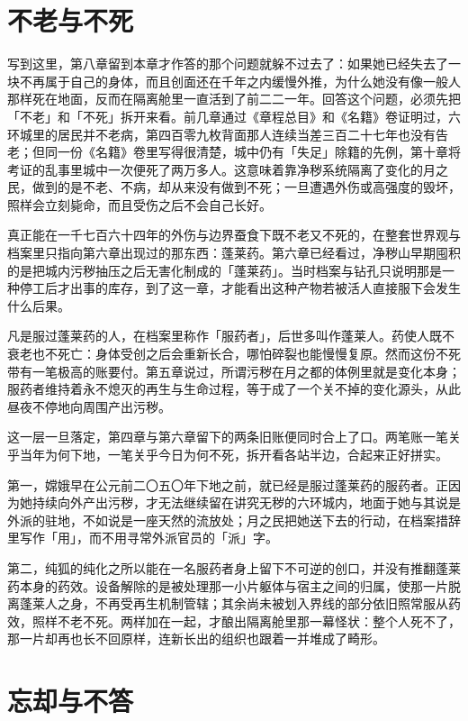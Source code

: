 \section{不老与不死}

写到这里，第八章留到本章才作答的那个问题就躲不过去了：如果她已经失去了一块不再属于自己的身体，而且创面还在千年之内缓慢外推，为什么她没有像一般人那样死在地面，反而在隔离舱里一直活到了前二二一年。回答这个问题，必须先把「不老」和「不死」拆开来看。前几章通过《章程总目》和《名籍》卷证明过，六环城里的居民并不老病，第四百零九枚背面那人连续当差三百二十七年也没有告老；但同一份《名籍》卷里写得很清楚，城中仍有「失足」除籍的先例，第十章将考证的乱事里城中一次便死了两万多人。这意味着靠净秽系统隔离了变化的月之民，做到的是不老、不病，却从来没有做到不死；一旦遭遇外伤或高强度的毁坏，照样会立刻毙命，而且受伤之后不会自己长好。

真正能在一千七百六十四年的外伤与边界蚕食下既不老又不死的，在整套世界观与档案里只指向第六章出现过的那东西：蓬莱药。第六章已经看过，净秽山早期囤积的是把城内污秽抽压之后无害化制成的「蓬莱药」。当时档案与钻孔只说明那是一种停工后才出事的库存，到了这一章，才能看出这种产物若被活人直接服下会发生什么后果。

凡是服过蓬莱药的人，在档案里称作「服药者」，后世多叫作蓬莱人。药使人既不衰老也不死亡：身体受创之后会重新长合，哪怕碎裂也能慢慢复原。然而这份不死带有一笔极高的账要付。第五章说过，所谓污秽在月之都的体例里就是变化本身；服药者维持着永不熄灭的再生与生命过程，等于成了一个关不掉的变化源头，从此昼夜不停地向周围产出污秽。

这一层一旦落定，第四章与第六章留下的两条旧账便同时合上了口。两笔账一笔关乎当年为何下地，一笔关乎今日为何不死，拆开看各站半边，合起来正好拼实。

第一，嫦娥早在公元前二〇五〇年下地之前，就已经是服过蓬莱药的服药者。正因为她持续向外产出污秽，才无法继续留在讲究无秽的六环城内，地面于她与其说是外派的驻地，不如说是一座天然的流放处；月之民把她送下去的行动，在档案措辞里写作「用」，而不用寻常外派官员的「派」字。

第二，纯狐的纯化之所以能在一名服药者身上留下不可逆的创口，并没有推翻蓬莱药本身的药效。设备解除的是被处理那一小片躯体与宿主之间的归属，使那一片脱离蓬莱人之身，不再受再生机制管辖；其余尚未被划入界线的部分依旧照常服从药效，照样不老不死。两样加在一起，才酿出隔离舱里那一幕怪状：整个人死不了，那一片却再也长不回原样，连新长出的组织也跟着一并堆成了畸形。

\section{忘却与不答}

